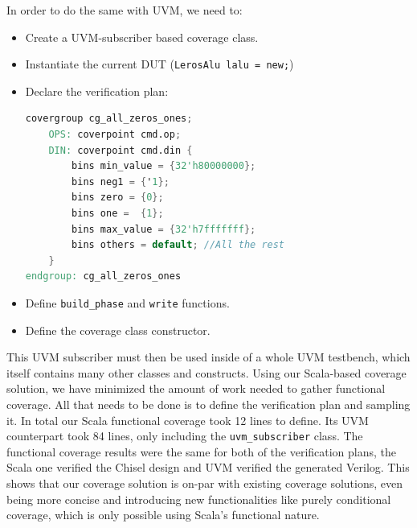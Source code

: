 \documentclass[conference]{IEEEtran}
\begin{document}
In order to do the same with UVM, we need to:  
\begin{itemize}
    \item Create a UVM-subscriber based coverage class.
    \item Instantiate the current DUT (\texttt{LerosAlu lalu  = new;})
    \item Declare the verification plan: 
    \begin{lstlisting}[language=verilog]
covergroup cg_all_zeros_ones;
	OPS: coverpoint cmd.op;
	DIN: coverpoint cmd.din {
		bins min_value = {32'h80000000};
		bins neg1 = {'1};
		bins zero = {0};
		bins one =  {1};
		bins max_value = {32'h7fffffff};
		bins others = default; //All the rest
	}
endgroup: cg_all_zeros_ones
    \end{lstlisting}
    \item Define \texttt{build\_phase} and \texttt{write} functions.
    \item Define the coverage class constructor.
\end{itemize}  
This UVM subscriber must then be used inside of a whole UVM testbench, which itself contains many other classes and constructs.
Using our Scala-based coverage solution, we have minimized the amount of work needed to gather functional coverage. 
All that needs to be done is to define the verification plan and sampling it.
In total our Scala functional coverage took 12 lines to define.
Its UVM counterpart took 84 lines, only including the \texttt{uvm\_subscriber} class.
The functional coverage results were the same for both of the verification plans, the Scala one verified the Chisel design and UVM verified the generated Verilog.
This shows that our coverage solution is on-par with existing coverage solutions, even being more concise and introducing new functionalities like purely conditional coverage, which is only possible using Scala's functional nature.

\end{document}
